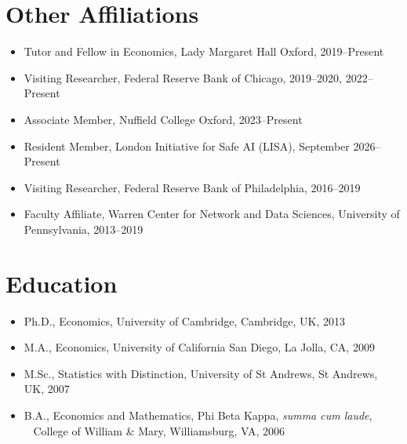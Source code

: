 \documentclass[line,overlapped]{myres}
\begin{document}
\begin{resume}
\section{\sc Other Affiliations}
\begin{itemize}
\item Tutor and Fellow in Economics, Lady Margaret Hall Oxford, 2019--Present
\item Visiting Researcher, Federal Reserve Bank of Chicago, 2019--2020, 2022--Present
\item Associate Member, Nuffield College Oxford, 2023--Present
\item Resident Member, London Initiative for Safe AI (LISA), September 2026--Present
\item Visiting Researcher, Federal Reserve Bank of Philadelphia, 2016--2019
\item Faculty Affiliate, Warren Center for Network and Data Sciences, University of Pennsylvania, \mbox{2013--2019}
\end{itemize}

\section{\sc Education}
\begin{itemize}
\item Ph.D., Economics, University of Cambridge, Cambridge, UK, 2013
\item M.A., Economics, University of California San Diego, La Jolla, CA, 2009
\item M.Sc., Statistics with Distinction, University of St Andrews, St Andrews, UK, 2007
\item B.A., Economics and Mathematics, Phi Beta Kappa, \emph{summa cum laude},\\ 
  \-\ \hspace{1em} College of William \& Mary, Williamsburg, VA, 2006
\end{itemize}





\end{resume}
\end{document}
